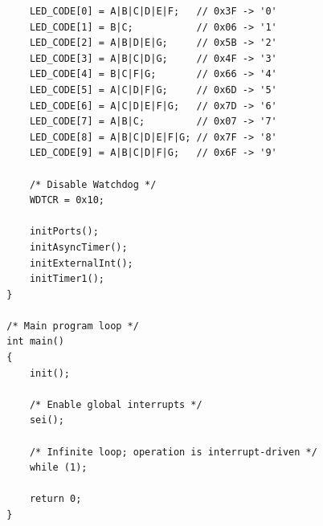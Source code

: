 \documentclass[14pt, a4paper]{extreport}
\begin{document}
\begin{verbatim}
			LED_CODE[0] = A|B|C|D|E|F;   // 0x3F -> '0'
			LED_CODE[1] = B|C;           // 0x06 -> '1'
			LED_CODE[2] = A|B|D|E|G;     // 0x5B -> '2'
			LED_CODE[3] = A|B|C|D|G;     // 0x4F -> '3'
			LED_CODE[4] = B|C|F|G;       // 0x66 -> '4'
			LED_CODE[5] = A|C|D|F|G;     // 0x6D -> '5'
			LED_CODE[6] = A|C|D|E|F|G;   // 0x7D -> '6'
			LED_CODE[7] = A|B|C;         // 0x07 -> '7'
			LED_CODE[8] = A|B|C|D|E|F|G; // 0x7F -> '8'
			LED_CODE[9] = A|B|C|D|F|G;   // 0x6F -> '9'
			
			/* Disable Watchdog */
			WDTCR = 0x10;
			
			initPorts();
			initAsyncTimer();
			initExternalInt();
			initTimer1();
		}
		
		/* Main program loop */
		int main()
		{
			init();
			
			/* Enable global interrupts */
			sei();
			
			/* Infinite loop; operation is interrupt-driven */
			while (1);
			
			return 0;
		}
	\end{verbatim}
\end{document}
